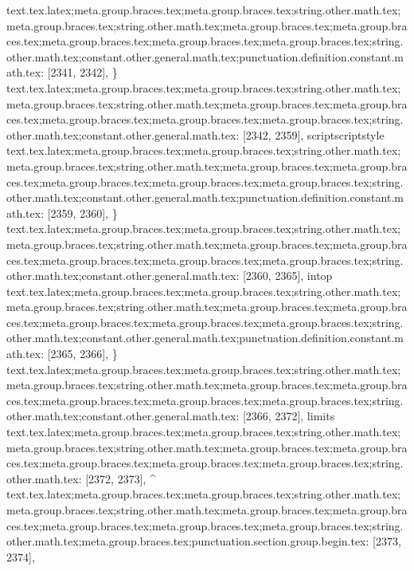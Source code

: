 {{{{{{{{{{{{{{{{{{{{{{{{{{{{{{{{{{{{{{{{{{{{{{{{{{{{{{{{{{{{{{{{{{{{{{{{{{{{{{{{{{{{text.tex.latex;meta.group.braces.tex;meta.group.braces.tex;string.other.math.tex;meta.group.braces.tex;string.other.math.tex;meta.group.braces.tex;meta.group.braces.tex;meta.group.braces.tex;meta.group.braces.tex;meta.group.braces.tex;string.other.math.tex;constant.other.general.math.tex;punctuation.definition.constant.math.tex: [2341, 2342], {\}
text.tex.latex;meta.group.braces.tex;meta.group.braces.tex;string.other.math.tex;meta.group.braces.tex;string.other.math.tex;meta.group.braces.tex;meta.group.braces.tex;meta.group.braces.tex;meta.group.braces.tex;meta.group.braces.tex;string.other.math.tex;constant.other.general.math.tex: [2342, 2359], {scriptscriptstyle}
text.tex.latex;meta.group.braces.tex;meta.group.braces.tex;string.other.math.tex;meta.group.braces.tex;string.other.math.tex;meta.group.braces.tex;meta.group.braces.tex;meta.group.braces.tex;meta.group.braces.tex;meta.group.braces.tex;string.other.math.tex;constant.other.general.math.tex;punctuation.definition.constant.math.tex: [2359, 2360], {\}
text.tex.latex;meta.group.braces.tex;meta.group.braces.tex;string.other.math.tex;meta.group.braces.tex;string.other.math.tex;meta.group.braces.tex;meta.group.braces.tex;meta.group.braces.tex;meta.group.braces.tex;meta.group.braces.tex;string.other.math.tex;constant.other.general.math.tex: [2360, 2365], {intop}
text.tex.latex;meta.group.braces.tex;meta.group.braces.tex;string.other.math.tex;meta.group.braces.tex;string.other.math.tex;meta.group.braces.tex;meta.group.braces.tex;meta.group.braces.tex;meta.group.braces.tex;meta.group.braces.tex;string.other.math.tex;constant.other.general.math.tex;punctuation.definition.constant.math.tex: [2365, 2366], {\}
text.tex.latex;meta.group.braces.tex;meta.group.braces.tex;string.other.math.tex;meta.group.braces.tex;string.other.math.tex;meta.group.braces.tex;meta.group.braces.tex;meta.group.braces.tex;meta.group.braces.tex;meta.group.braces.tex;string.other.math.tex;constant.other.general.math.tex: [2366, 2372], {limits}
text.tex.latex;meta.group.braces.tex;meta.group.braces.tex;string.other.math.tex;meta.group.braces.tex;string.other.math.tex;meta.group.braces.tex;meta.group.braces.tex;meta.group.braces.tex;meta.group.braces.tex;meta.group.braces.tex;string.other.math.tex: [2372, 2373], {^}
text.tex.latex;meta.group.braces.tex;meta.group.braces.tex;string.other.math.tex;meta.group.braces.tex;string.other.math.tex;meta.group.braces.tex;meta.group.braces.tex;meta.group.braces.tex;meta.group.braces.tex;meta.group.braces.tex;string.other.math.tex;meta.group.braces.tex;punctuation.section.group.begin.tex: [2373, 2374], {{}
}}}}}}}}}}}}}}}}}}}}}}}}}}}}}}}}}}}}}}}}}}}}}}}}}}}}}}}}}}}}}}}}}}}}}}}}}}}}}}}}}}}}}}}}
